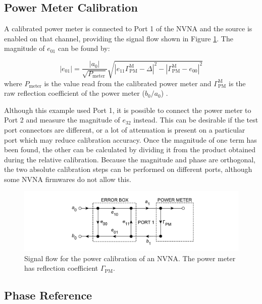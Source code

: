 \documentclass[../thesis/thesis.tex]{subfiles}
\begin{document}
\subsection{Power Meter Calibration}

A calibrated power meter is connected to Port 1 of the NVNA and the source is enabled on that channel, providing the signal flow shown in Figure \ref{ch2_fig_powercal}. The magnitude of $e_{01}$ can be found by:

\begin{equation}
	|e_{01}| = \frac{|a_0|}{\sqrt{P_\textrm{meter}}}\sqrt{|e_{11}\Gamma^\textrm{M}_\textrm{PM}-\Delta|^2-|\Gamma^\textrm{M}_\textrm{PM}-e_{00}|^2}
\end{equation}
where $P_\textrm{meter}$ is the value read from the calibrated power meter and $\Gamma^\textrm{M}_\textrm{PM}$ is the raw reflection coefficient of the power meter ($b_0/a_0$) \cite{Lin_2012}.

Although this example used Port 1, it is possible to connect the power meter to Port 2 and measure the magnitude of $e_{32}$ instead. This can be desirable if the test port connectors are different, or a lot of attenuation is present on a particular port which may reduce calibration accuracy. Once the magnitude of one term has been found, the other can be calculated by dividing it from the product obtained during the relative calibration. Because the magnitude and phase are orthogonal, the two absolute calibration steps can be performed on different ports, although some NVNA firmwares do not allow this.

\begin{figure}
	\centering
	\includegraphics[width=\textwidth]{ch2_powercal}
	\caption[The power calibration of an NVNA.]{Signal flow for the power calibration of an NVNA. The power meter has reflection coefficient $\Gamma_\textrm{PM}$.}
	\label{ch2_fig_powercal}
\end{figure}

\subsection{Phase Reference}
\end{document}
